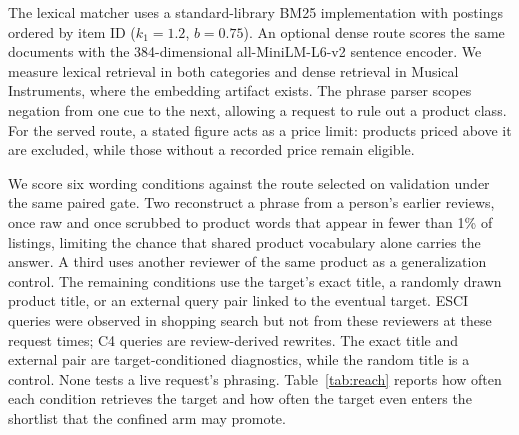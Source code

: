 \documentclass[11pt]{article}
\begin{document}
The lexical matcher uses a standard-library BM25 implementation with postings ordered by item ID ($k_1=1.2$, $b=0.75$). An optional dense route scores the same documents with the 384-dimensional all-MiniLM-L6-v2 sentence encoder. We measure lexical retrieval in both categories and dense retrieval in Musical Instruments, where the embedding artifact exists. The phrase parser scopes negation from one cue to the next, allowing a request to rule out a product class. For the served route, a stated figure acts as a price limit: products priced above it are excluded, while those without a recorded price remain eligible.

We score six wording conditions against the route selected on validation under the same paired gate. Two reconstruct a phrase from a person's earlier reviews, once raw and once scrubbed to product words that appear in fewer than 1\% of listings, limiting the chance that shared product vocabulary alone carries the answer. A third uses another reviewer of the same product as a generalization control. The remaining conditions use the target's exact title, a randomly drawn product title, or an external query pair linked to the eventual target. ESCI queries were observed in shopping search but not from these reviewers at these request times; C4 queries are review-derived rewrites. The exact title and external pair are target-conditioned diagnostics, while the random title is a control. None tests a live request's phrasing. Table~\ref{tab:reach} reports how often each condition retrieves the target and how often the target even enters the shortlist that the confined arm may promote.
\end{document}
